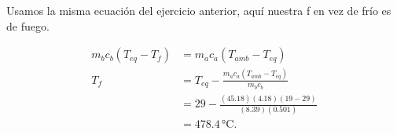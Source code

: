 \documentclass[article,12pt]{elsarticle}
\begin{document}
Usamos la misma ecuación del ejercicio anterior, aquí nuestra f en vez de frío es de fuego.

\begin{align*}
    m_bc_b(T_{eq}-T_f) &= m_ac_a(T_{amb}-T_{eq}) \\
    T_f &= T_{eq}-\frac{m_ac_a(T_{amb}-T_{eq})}{m_bc_b} \\
    &= 29 - \frac{(45.18)(4.18)(19 - 29)}{(8.39)(0.501)} \\
    &= 478.4 \, \text{°C}.
\end{align*}
\end{document}
